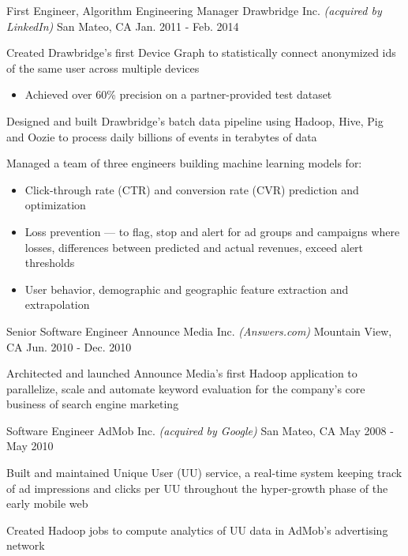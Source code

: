 \begin{cventries}
  \cventry
  {First Engineer, Algorithm Engineering Manager} %
  {Drawbridge Inc. \bodyfontlight\emph{(acquired by LinkedIn)}} %
  {San Mateo, CA} %
  {Jan. 2011 - Feb. 2014} %
  {
    \begin{cvitems} %
      \item{Created Drawbridge's first Device Graph to statistically connect anonymized ids of the same user across multiple devices}
      \begin{itemize}[label=$\circ$]
        \item{Achieved over 60\% precision on a partner-provided test dataset}
      \end{itemize}
      \item{Designed and built Drawbridge’s batch data pipeline using Hadoop, Hive, Pig and Oozie to process daily billions of events in terabytes of data}
      \item{Managed a team of three engineers building machine learning models for:}
      \begin{itemize}[label=$\circ$]
        \item{Click-through rate (CTR) and conversion rate (CVR) prediction and optimization}
        \item{Loss prevention --- to flag, stop and alert for ad groups and campaigns where losses, differences between predicted and actual revenues, exceed alert thresholds}
        \item{User behavior, demographic and geographic feature extraction and extrapolation}
      \end{itemize}
    \end{cvitems}
  }

  \cventry
  {Senior Software Engineer} %
  {Announce Media Inc. \bodyfontlight\emph{(Answers.com)}} %
  {Mountain View, CA} %
  {Jun. 2010 - Dec. 2010} %
  {
    \begin{cvitems} %
      \item{Architected and launched Announce Media’s first Hadoop application to parallelize, scale and automate keyword evaluation for the company's core business of search engine marketing}
    \end{cvitems}
  }

  \cventry
  {Software Engineer} %
  {AdMob Inc. \bodyfontlight\emph{(acquired by Google)}} %
  {San Mateo, CA} %
  {May 2008 - May 2010} %
  {
    \begin{cvitems} %
      \item{Built and maintained Unique User (UU) service, a real-time system keeping track of ad impressions and clicks per UU throughout the hyper-growth phase of the early mobile web}
      \item{Created Hadoop jobs to compute analytics of UU data in AdMob's advertising network}
    \end{cvitems}
  }


\end{cventries}
